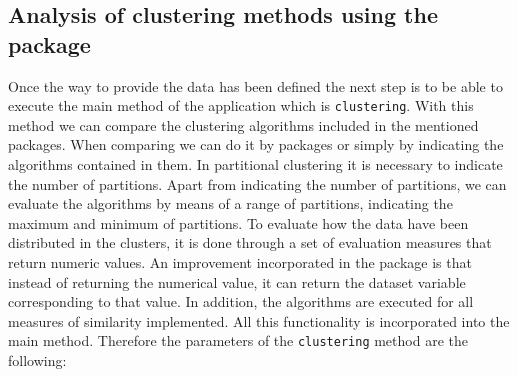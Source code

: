 \subsection {Analysis of clustering methods using the  package}

Once the way to provide the data has been defined the next step is to be able to execute the main method of the application which is \texttt{clustering}. With this method we can compare the clustering algorithms included in the mentioned packages. When comparing we can do it by packages or simply by indicating the algorithms contained in them. In partitional clustering it is necessary to indicate the number of partitions. Apart from indicating the number of partitions, we can evaluate the algorithms by means of a range of partitions, indicating the maximum and minimum of partitions. To evaluate how the data have been distributed in the clusters, it is done through a set of evaluation measures that return numeric values. An improvement incorporated in the package is that instead of returning the numerical value, it can return the dataset variable corresponding to that value. In addition, the algorithms are executed for all measures of similarity implemented. All this functionality is incorporated into the main method. Therefore the parameters of the \texttt{clustering} method are the following:
